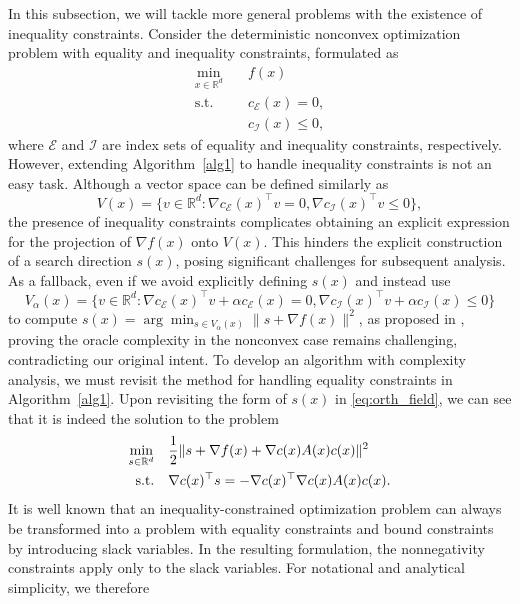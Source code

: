 \documentclass[11pt]{article}
\newcommand{\R}{\mathbb{R}}
\newcommand{\be}{\begin{equation}}
\newcommand{\ee}{\end{equation}}
\begin{document}
In this subsection, we will tackle more general problems with  the existence of inequality constraints. Consider the deterministic nonconvex optimization problem with equality and inequality constraints, formulated as
\be\label{p2}
\begin{aligned}
\min_{x\in\R^d} & \quad f(x) \\
\mbox{s.t.} & \quad c_{\mathcal E}(x) = 0,\\
& \quad c_{\mathcal I}(x) \leq 0,
\end{aligned}
\ee
where $\mathcal E$ and $\mathcal I$ are index sets of   equality and inequality constraints, respectively. However, extending Algorithm~\ref{alg1} to handle inequality constraints is not an easy task. Although a vector space can be defined similarly as
\[
V(x) = \{ v \in \mathbb{R}^d : \nabla c_{\mathcal{E}}(x)^{\top} v = 0, \nabla c_{\mathcal{I}}(x)^{\top} v \leq 0 \},
\]
the presence of inequality constraints complicates obtaining an explicit expression for the projection of \(\nabla f(x)\) onto \(V(x)\). This hinders the {explicit} construction of a {search} direction \(s(x)\), posing significant challenges for subsequent analysis. As a fallback, even if we avoid explicitly defining \(s(x)\) and instead use
\[
V_{\alpha}(x) = \{ v \in \mathbb{R}^d : \nabla c_{\mathcal{E}}(x)^{\top} v + \alpha c_{\mathcal{E}}(x) = 0, \nabla c_{\mathcal{I}}(x)^{\top} v + \alpha c_{\mathcal{I}}(x) \leq 0 \}
\]
to compute \(s(x) = \arg\min_{s \in V_{\alpha}(x)} \|s + \nabla f(x)\|^2\), as proposed in \cite {Muehlebach2022Constraints}, proving the oracle complexity in the nonconvex case remains challenging, contradicting our original intent. To develop an algorithm with complexity analysis, we must revisit the method for handling equality constraints in Algorithm~\ref{alg1}. Upon revisiting the form of $s(x)$ in \eqref{eq:orth_field}, we {can see that it} is indeed the solution to the  problem
\be\label{opt4sk}
\begin{aligned}
\min_{s\in\R^d} &\quad \frac{1}{2}\|s+\nabla f(x) + \nabla c(x) A(x) c(x)\|^2 \\
{\rm s.t.}&\quad \nabla c(x)^\top s = - \nabla c(x)^\top \nabla c(x) A(x) c(x).
\end{aligned}
\ee
It is well known that an inequality-constrained optimization problem can always be transformed into a problem with equality constraints and bound constraints by introducing slack variables. {In the resulting formulation, the nonnegativity constraints apply only to the slack variables.
For notational and analytical simplicity, we therefore}
\end{document}
